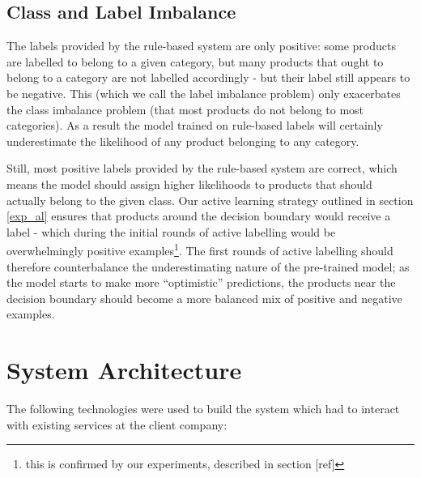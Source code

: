 \subsection{Class and Label Imbalance}

The labels provided by the rule-based system are only positive:  some products are labelled to belong to a given category, but many products that ought to belong to a category are not labelled  accordingly -  but their label still appears to be negative.
This (which we call the label imbalance problem) only exacerbates the class imbalance problem (that most products do not belong to most categories).
As a result the model trained on rule-based labels will certainly underestimate the likelihood of any product belonging to any category.

Still, most positive labels provided by the rule-based system are correct, which means the model should assign higher likelihoods to products that should actually belong to the given class.
Our active learning strategy outlined in section \ref{exp_al} ensures that products around the decision boundary would receive a label - which during the initial rounds of active labelling would be overwhelmingly positive examples\footnote{this is confirmed by our experiments, described in section [ref]}.
The first rounds of active labelling should therefore counterbalance the underestimating nature of the pre-trained model; as the model starts to make more ``optimistic'' predictions, the products near the decision boundary should become a more balanced mix of positive and negative examples.

\section{System Architecture}
\label{architecture}

 The following technologies were used to build the system which had to interact with existing services  at the client company:


